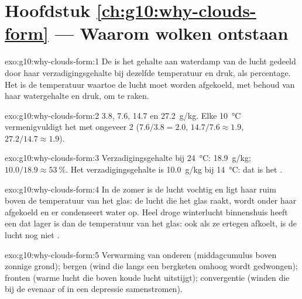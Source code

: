 \section*{Hoofdstuk \ref{ch:g10:why-clouds-form} --- Waarom wolken ontstaan}

\begin{solution}{exo:g10:why-clouds-form:1}
De  is het gehalte aan waterdamp van de lucht gedeeld
door haar verzadigingsgehalte bij dezelfde temperatuur en druk, als percentage.
Het  is de temperatuur waartoe de lucht moet worden afgekoeld, met behoud
van haar watergehalte en druk, om  te raken.
\end{solution}

\begin{solution}{exo:g10:why-clouds-form:2}
\num{3.8}, \num{7.6}, \num{14.7} en \qty{27.2}{g/kg}. Elke
\qty{10}{\degreeCelsius} vermenigvuldigt het met ongeveer 2 ($7.6/3.8 = 2.0$,
$14.7/7.6 \approx 1.9$, $27.2/14.7 \approx 1.9$).
\end{solution}

\begin{solution}{exo:g10:why-clouds-form:3}
Verzadigingsgehalte bij \qty{24}{\degreeCelsius}: \qty{18.9}{g/kg};  $10.0/18.9 \approx \qty{53}{\percent}$. Het verzadigingsgehalte
is \qty{10.0}{g/kg} bij \qty{14}{\degreeCelsius}: dat is het .
\end{solution}

\begin{solution}{exo:g10:why-clouds-form:4}
In de zomer is de lucht vochtig en ligt haar  ruim boven de temperatuur
van het glas: de lucht die het glas raakt, wordt onder haar  afgekoeld en
er condenseert water op. Heel droge winterlucht binnenshuis heeft een 
dat lager is dan de temperatuur van het glas: ook als ze ertegen afkoelt, is de
lucht nog niet .
\end{solution}

\begin{solution}{exo:g10:why-clouds-form:5}
Verwarming van onderen (middagcumulus boven zonnige grond); bergen (wind die
langs een bergketen omhoog wordt gedwongen); fronten (warme lucht die boven koude
lucht uitstijgt); convergentie (winden die bij de evenaar of in een depressie
samenstromen).
\end{solution}

